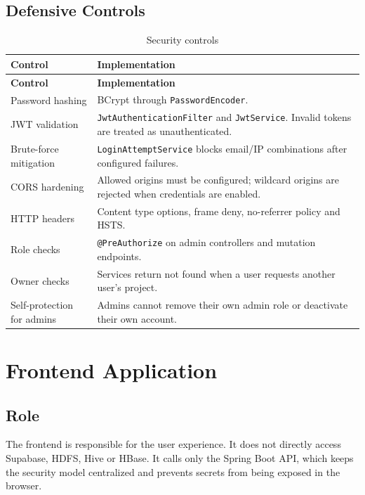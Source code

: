 \documentclass[12pt,a4paper]{report}
\begin{document}
\section{Defensive Controls}
\begin{longtable}{p{}p{}}
\caption{Security controls}\\
\toprule
\textbf{Control} & \textbf{Implementation}\\
\midrule
\endfirsthead
\toprule
\textbf{Control} & \textbf{Implementation}\\
\midrule
\endhead
Password hashing & BCrypt through \texttt{PasswordEncoder}.\\
JWT validation & \texttt{JwtAuthenticationFilter} and \texttt{JwtService}. Invalid tokens are treated as unauthenticated.\\
Brute-force mitigation & \texttt{LoginAttemptService} blocks email/IP combinations after configured failures.\\
CORS hardening & Allowed origins must be configured; wildcard origins are rejected when credentials are enabled.\\
HTTP headers & Content type options, frame deny, no-referrer policy and HSTS.\\
Role checks & \texttt{@PreAuthorize} on admin controllers and mutation endpoints.\\
Owner checks & Services return not found when a user requests another user's project.\\
Self-protection for admins & Admins cannot remove their own admin role or deactivate their own account.\\
\bottomrule
\end{longtable}

\chapter{Frontend Application}

\section{Role}
The frontend is responsible for the user experience. It does not directly access Supabase, HDFS, Hive or HBase. It calls only the Spring Boot API, which keeps the security model centralized and prevents secrets from being exposed in the browser.
\end{document}
